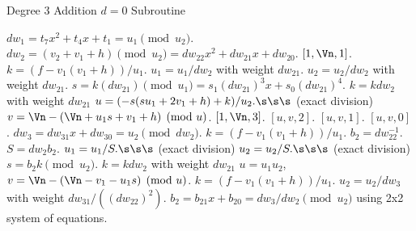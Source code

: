 \begin{algorithm}
    \caption{Degree 3 Addition $d = 0$ Subroutine \label{alg:g3explSPLIT3ADDd}}
    \begin{algorithmic} [1]
    \State $dw_1 = t_7x^2 + t_4x + t_1 = u_1 \pmod{u_2}$. 
            \State $dw_2 =  (v_2 + v_1 + h) \pmod{u_2} = dw_{22}x^2 + dw_{21}x + dw_{20}.$
                 \hspace{1pt} \Return $[1,\Vn,1]$.
                \Else 
                    \State $k = (f - v_1(v_1 + h))/u_1$.
                    \State $u_1 = u_1/dw_2$ with weight $dw_{21}$.
                    \State $u_2 = u_2/dw_2$ with weight $dw_{21}$.
                    \State $s = k(dw_{21}) \pmod{u_1} = s_1(dw_{21})^3x + s_0(dw_{21})^4$.
                    \State $k = kdw_2$ with weight $dw_{21}$
                    \State $u = (-s(su_1 + 2v_1 + h) + k)/u_2. \s\s\s$ (exact division)
                    \State $v = \Vn - (\Vn +u_1s + v_1 + h) \pmod{u}$.
                             \hspace{2pt} \Return $[1,\Vn,3]$.
                            \Else \hspace{2pt} \Return $[u,v,2]$.
                            \EndIf
                        \Else \hspace{2pt} \Return $[u,v,1]$.
                        \EndIf
                    \Else \hspace{2pt} \Return $[u,v,0]$.
                    \EndIf
                \EndIf
            \Else
                \State $dw_3 = dw_{31}x + dw_{30} = u_2 \pmod{dw_2}$.
                    \State $k = (f - v_1(v_1 + h))/u_1$.
                    \State $b_2 = dw_{22}^{-1}.$
                    \State $S = dw_2b_2$.
                    \State $u_1 = u_1/S. \s\s\s$ (exact division)
                    \State $u_2 = u_2/S. \s\s\s$ (exact division)
                    \State $s = b_2k \pmod{u_2}$.
                    \State $k = kdw_2$ with weight $dw_{21}$
                    \State $u = u_1u_2$, $v = \Vn - (\Vn - v_1 - u_1s) \pmod{u}$.
                \Else
                    \State $k = (f - v_1(v_1 + h))/u_1$.
                    \State $u_2 = u_2/dw_3$ with weight $dw_{31}/((dw_{22})^2)$.
                    \State $b_2 = b_{21}x + b_{20} = dw_3/dw_2 \pmod{ u_2}$ using 2x2 system of equations.

\end{algorithmic}
\end{algorithm}
